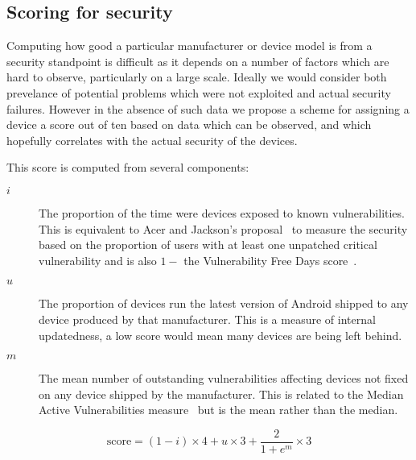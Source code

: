 \subsection{Scoring for security}
\label{sec:security_scoring}

Computing how good a particular manufacturer or device model is from a security standpoint is difficult as it depends on a number of factors which are hard to observe, particularly on a large scale.
Ideally we would consider both prevelance of potential problems which were not exploited and actual security failures.
However in the absence of such data we propose a scheme for assigning a device a score out of ten based on data which can be observed, and which hopefully correlates with the actual security of the devices.

This score is computed from several components:
\begin{description}
  \item[$i$] The proportion of the time were devices exposed to known vulnerabilities. This is equivalent to Acer and Jackson's proposal~\cite{Acer2010} to measure the security based on the proportion of users with at least one unpatched critical vulnerability and is also $1 -$ the Vulnerability Free Days score~\cite{Wright2014}.
  \item[$u$] The proportion of devices run the latest version of Android shipped to any device produced by that manufacturer. This is a measure of internal updatedness, a low score would mean many devices are being left behind.
  \item[$m$] The mean number of outstanding vulnerabilities affecting devices not fixed on any device shipped by the manufacturer. This is related to the Median Active Vulnerabilities measure~\cite{Wright2014} but is the mean rather than the median.
\end{description}
\begin{equation}
\mathrm{score} = (1 - i)\times 4 + u \times 3 + \frac{2}{1+e^m} \times 3
\end{equation}

